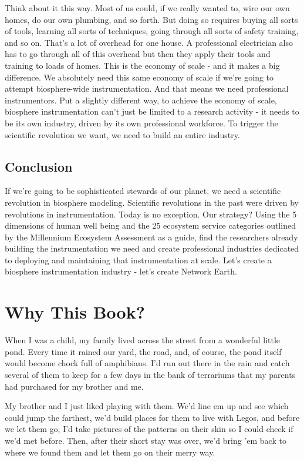 \documentclass[11pt,a5paper]{book}
\begin{document}
Think about it this way. Most of us could, if we really wanted to, wire our own homes, do our own plumbing, and so forth. But doing so requires buying all sorts of tools, learning all sorts of techniques, going through all sorts of safety training, and so on. That's a lot of overhead for one house. A professional electrician also has to go through all of this overhead but then they apply their tools and training to loads of homes. This is the economy of scale - and it makes a big difference. We absolutely need this same economy of scale if we're going to attempt biosphere-wide instrumentation. And that means we need professional instrumentors. Put a slightly different way, to achieve the economy of scale, biosphere instrumentation can't just be limited to a research activity - it needs to be its own industry, driven by its own professional workforce. To trigger the scientific revolution we want, we need to build an entire industry.
\newline

\section{Conclusion}

If we're going to be sophisticated stewards of our planet, we need a scientific revolution in biosphere modeling. Scientific revolutions in the past were driven by revolutions in instrumentation. Today is no exception. Our strategy? Using the 5 dimensions of human well being and the 25 ecosystem service categories outlined by the Millennium Ecosystem Assessment as a guide, find the researchers already building the instrumentation we need and create professional industries dedicated to deploying and maintaining that instrumentation at scale. Let's create a biosphere instrumentation industry - let's create Network Earth.

\chapter{Why This Book?}
When I was a child, my family lived across the street from a wonderful little pond. Every time it rained our yard, the road, and, of course, the pond itself would become chock full of amphibians. I'd run out there in the rain and catch several of them to keep for a few days in the bank of terrariums that my parents had purchased for my brother and me.
\newline

My brother and I just liked playing with them. We'd line em up and see which could jump the farthest, we'd build places for them to live with Legos, and before we let them go, I'd take pictures of the patterns on their skin so I could check if we'd met before. Then, after their short stay was over, we'd bring 'em back to where we found them and let them go on their merry way.
\newline
\end{document}
